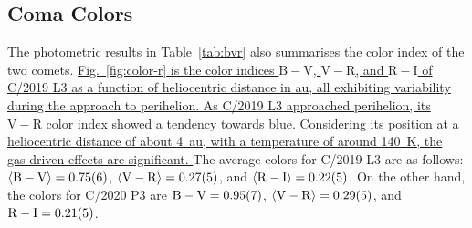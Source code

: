 \begin{comment}
        
\begin{figure}[h]
    \ContinuedFloat
    
    \begin{subfigure}{\textwidth}
    \centering
    \texttt{[image: Afrho\_C2019\_1.pdf]}
    \caption{Second subfigure.}
    \label{fig:second}
    \end{subfigure}
    \begin{subfigure}{\textwidth}
    \centering
    \texttt{[image: Afrho\_C2019\_2.pdf]}
    \caption{Third subfigure.}
    \label{fig:third}
    \end{subfigure}
    
    \caption{Page breaks and subfigures.}
    \label{fig:figures}
    
\end{figure}
\end{comment}




\subsection{Coma Colors}

The photometric results in Table~\ref{tab:bvr} also summarises the color index of the two comets. 
\ul{Fig.~\ref{fig:color-r} is the color indices $\mathrm{B}-\mathrm{V}$, $\mathrm{V}-\mathrm{R}$, and $\mathrm{R}-\mathrm{I}$ of C/2019 L3 as a function of heliocentric distance in \si{\astronomicalunit}, all exhibiting variability during the approach to perihelion. 
As C/2019 L3 approached perihelion, its $\mathrm{V}-\mathrm{R}$ color index showed a tendency towards blue. 
Considering its position at a heliocentric distance of about {\SI{4}{\astronomicalunit}}, with a temperature of around {\SI{140}{\K}}, the gas-driven effects are significant. 
}
The average colors for C/2019 L3 are as follows: 
$\langle \mathrm{B} - \mathrm{V} \rangle = \num{0.75 +- 0.06}$, 
$\langle \mathrm{V} - \mathrm{R} \rangle = \num{0.27 +- 0.05}$, and 
$\langle \mathrm{R} - \mathrm{I} \rangle = \num{0.22 +- 0.05}$. 
On the other hand, the colors for C/2020 P3 are 
$\mathrm{B} - \mathrm{V} = \num{0.95 +- 0.07}$, 
$\langle \mathrm{V} - \mathrm{R} \rangle = \num{0.29 +- 0.05}$, and 
$\mathrm{R} - \mathrm{I} = \num{0.21 +- 0.05}$. 

